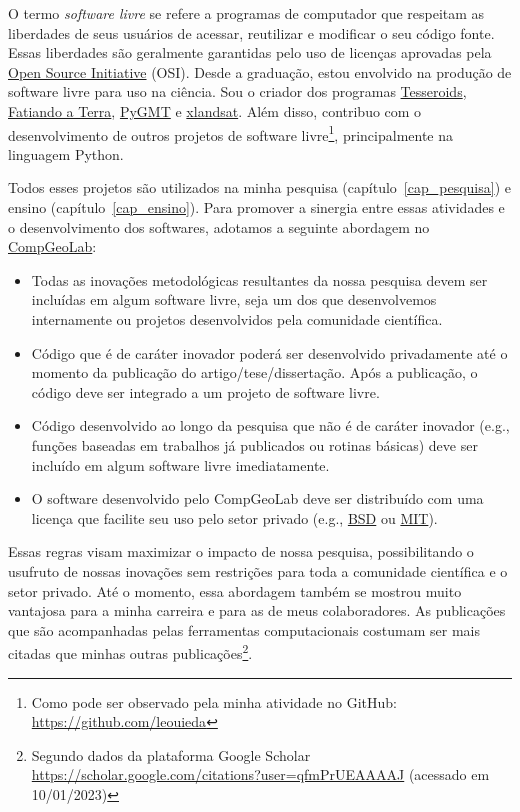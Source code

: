 \documentclass[12pt,a4paper,oneside]{book}
\begin{document}
O termo \textit{software livre} se refere a programas de computador que
respeitam as liberdades de seus usuários de acessar, reutilizar e modificar o
seu código fonte.
Essas liberdades são geralmente garantidas pelo uso de licenças aprovadas pela
\href{https://opensource.org/}{Open Source Initiative} (OSI).
Desde a graduação, estou envolvido na produção de software livre para uso na
ciência.
Sou o criador dos programas
\href{https://tesseroids.leouieda.com}{Tesseroids},
\href{https://www.fatiando.org}{Fatiando a Terra},
\href{https://www.pygmt.org}{PyGMT} e
\href{https://www.compgeolab.org/xlandsat}{xlandsat}.
Além disso, contribuo com o desenvolvimento de outros projetos de software
livre\footnote{Como pode ser observado pela minha atividade no GitHub:
\url{https://github.com/leouieda}}, principalmente na linguagem Python.

Todos esses projetos são utilizados na minha pesquisa
(capítulo~\ref{cap_pesquisa}) e ensino (capítulo~\ref{cap_ensino}).
Para promover a sinergia entre essas atividades e o desenvolvimento dos
softwares, adotamos a seguinte abordagem no
\href{https://www.compgeolab.org/}{CompGeoLab}:

\begin{itemize}
  \item Todas as inovações metodológicas resultantes da nossa pesquisa devem
    ser incluídas em algum software livre, seja um dos que desenvolvemos
    internamente ou projetos desenvolvidos pela comunidade científica.
  \item Código que é de caráter inovador poderá ser desenvolvido privadamente
    até o momento da publicação do artigo/tese/dissertação. Após a publicação,
    o código deve ser integrado a um projeto de software livre.
  \item Código desenvolvido ao longo da pesquisa que não é de caráter
    inovador (e.g., funções baseadas em trabalhos já publicados ou rotinas
    básicas) deve ser incluído em algum software livre imediatamente.
  \item O software desenvolvido pelo CompGeoLab deve ser distribuído com uma
    licença que facilite seu uso pelo setor privado (e.g.,
    \href{https://opensource.org/licenses/BSD-3-Clause}{BSD} ou
    \href{https://opensource.org/licenses/MIT}{MIT}).
\end{itemize}

Essas regras visam maximizar o impacto de nossa pesquisa, possibilitando o
usufruto de nossas inovações sem restrições para toda a comunidade científica e
o setor privado.
Até o momento, essa abordagem também se mostrou muito vantajosa para a minha
carreira e para as de meus colaboradores.
As publicações que são acompanhadas pelas ferramentas computacionais
\citep[e.g.,][]{Uieda2016,Uieda2017} costumam ser mais citadas que minhas
outras publicações\footnote{Segundo dados da plataforma Google Scholar
\url{https://scholar.google.com/citations?user=qfmPrUEAAAAJ} (acessado em
10/01/2023)}.
\end{document}
